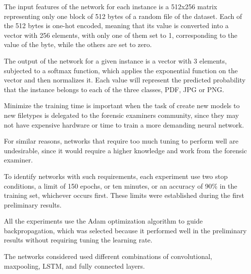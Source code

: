 
The input features of the network for each instance is a 512x256 matrix representing only one block of 512 bytes of a random file of the dataset. Each of the 512 bytes is one-hot encoded, meaning that its value is converted into a vector with 256 elements, with only one of them set to 1, corresponding to the value of the byte, while the others are set to zero.

The output of the network for a given instance is a vector with 3 elements, subjected to a softmax function, which applies the exponential function on the vector and then normalizes it. Each value will represent the predicted probability that the instance belongs to each of the three classes, PDF, JPG or PNG.

Minimize the training time is important when the task of create new models to new filetypes is delegated to the forensic examiners community, since they may not have expensive hardware or time to train a more demanding neural network.

For similar reasons, networks that require too much tuning to perform well are undesirable, since it would require a higher knowledge and work from the forensic examiner.


To identify networks with such requirements, each experiment use two stop conditions, a limit of 150 epochs, or ten minutes, or an accuracy of 90\% in the training set, whichever occurs first. These limits were established during the first preliminary results.

All the experiments use the Adam \cite{kingma_adam:_2014}
optimization algorithm to guide backpropagation, which was selected because it performed well in the preliminary results without requiring tuning the learning rate.

The networks considered used different combinations of convolutional, maxpooling, LSTM, and fully connected layers.



